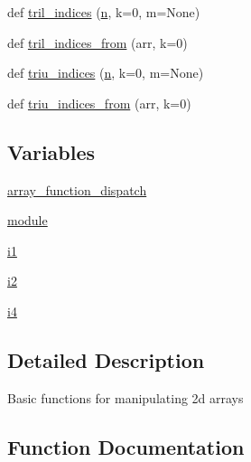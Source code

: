 \begin{DoxyCompactItemize}
def \hyperlink{namespacenumpy_1_1lib_1_1twodim__base_a2b716112412d6d2a7d5c6d62479ab0f8}{tril\+\_\+indices} (\hyperlink{namespacenumpy_a352663c52853d2754274407d5cae2832}{n}, k=0, m=None)
\item 
def \hyperlink{namespacenumpy_1_1lib_1_1twodim__base_acf3be40e3614389bdaded615b72aa5e0}{tril\+\_\+indices\+\_\+from} (arr, k=0)
\item 
def \hyperlink{namespacenumpy_1_1lib_1_1twodim__base_ab3a38f5d340ce47aebc8046a4d7d57d7}{triu\+\_\+indices} (\hyperlink{namespacenumpy_a352663c52853d2754274407d5cae2832}{n}, k=0, m=None)
\item 
def \hyperlink{namespacenumpy_1_1lib_1_1twodim__base_aaa286c33b12fe305ea9ead63f3f25f38}{triu\+\_\+indices\+\_\+from} (arr, k=0)
\end{DoxyCompactItemize}
\subsection*{Variables}
\begin{DoxyCompactItemize}
\item 
\hyperlink{namespacenumpy_1_1lib_1_1twodim__base_a12fefeaaa42281321c1a4d46f5466e78}{array\+\_\+function\+\_\+dispatch}
\item 
\hyperlink{namespacenumpy_1_1lib_1_1twodim__base_ad8e45c14f052afdf95f8cf7a4f957bcb}{module}
\item 
\hyperlink{namespacenumpy_1_1lib_1_1twodim__base_a06cfcadf2383c62ad7ab2416c9d6be56}{i1}
\item 
\hyperlink{namespacenumpy_1_1lib_1_1twodim__base_a1faf902c5cb76b708ad9b9b7817e6fee}{i2}
\item 
\hyperlink{namespacenumpy_1_1lib_1_1twodim__base_a5f21f9684d5a55768287866e474514f7}{i4}
\end{DoxyCompactItemize}


\subsection{Detailed Description}
\begin{DoxyVerb}Basic functions for manipulating 2d arrays\end{DoxyVerb}
 

\subsection{Function Documentation}
\mbox{\label{namespacenumpy_1_1lib_1_1twodim__base_ab5c9fa6bbfe9e559e90c311d320b49f3}} 
